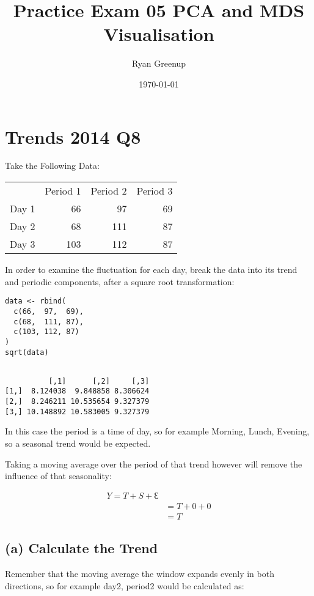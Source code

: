 \documentclass[11pt]{article}
\author{Ryan Greenup}
\date{\today}
\title{Practice Exam 05 PCA and MDS Visualisation}
\begin{document}
\maketitle
\tableofcontents

\section{Trends 2014 Q8}
\label{sec:orge26256b}

Take the Following Data:

\begin{center}
\begin{tabular}{lrrr}
 & Period 1 & Period 2 & Period 3\\
Day 1 & 66 & 97 & 69\\
Day 2 & 68 & 111 & 87\\
Day 3 & 103 & 112 & 87\\
\end{tabular}
\end{center}

In order to examine the fluctuation for each day, break the data into its trend and periodic components, after a square root transformation:

\begin{verbatim}
data <- rbind(
  c(66,  97,  69),
  c(68,  111, 87),
  c(103, 112, 87)
)
sqrt(data)
\end{verbatim}

\begin{verbatim}

          [,1]      [,2]     [,3]
[1,]  8.124038  9.848858 8.306624
[2,]  8.246211 10.535654 9.327379
[3,] 10.148892 10.583005 9.327379
\end{verbatim}



In this case the period is a time of day, so for example Morning, Lunch, Evening, so a seasonal trend would be expected.

Taking a moving average over the period of that trend however will remove the influence of that seasonality:

$$\begin{aligned}
Y  = T + S + Ɛ               \\
  &= T + 0 + 0               \\
  &= T
\end{aligned}$$

\subsection{(a) Calculate the Trend}
\label{sec:org4fa20ee}
Remember that the moving average the window expands evenly in both directions, so for example day2, period2 would be calculated as:
\end{document}
